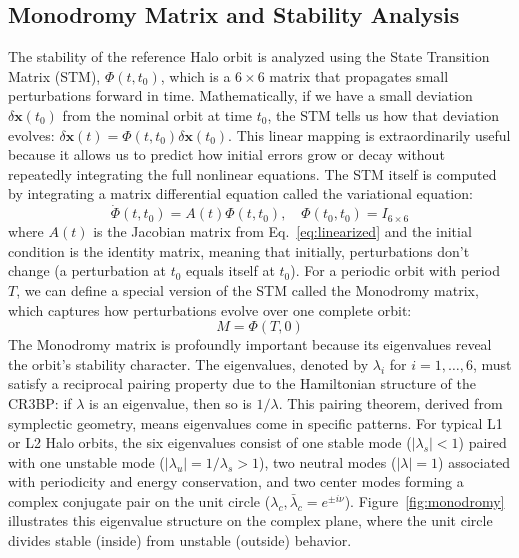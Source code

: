 \documentclass[10pt,letterpaper]{article}
\begin{document}
\subsection{Monodromy Matrix and Stability Analysis}
The stability of the reference Halo orbit is analyzed using the State Transition Matrix (STM), $\Phi(t, t_0)$, which is a $6 \times 6$ matrix that propagates small perturbations forward in time. Mathematically, if we have a small deviation $\delta \mathbf{x}(t_0)$ from the nominal orbit at time $t_0$, the STM tells us how that deviation evolves: $\delta \mathbf{x}(t) = \Phi(t, t_0) \delta \mathbf{x}(t_0)$. This linear mapping is extraordinarily useful because it allows us to predict how initial errors grow or decay without repeatedly integrating the full nonlinear equations. The STM itself is computed by integrating a matrix differential equation called the variational equation:
\begin{equation}
    \dot{\Phi}(t, t_0) = A(t) \Phi(t, t_0), \quad \Phi(t_0, t_0) = I_{6 \times 6} \label{eq:stm}
\end{equation}
where $A(t)$ is the Jacobian matrix from Eq.~\ref{eq:linearized} and the initial condition is the identity matrix, meaning that initially, perturbations don't change (a perturbation at $t_0$ equals itself at $t_0$). For a periodic orbit with period $T$, we can define a special version of the STM called the Monodromy matrix, which captures how perturbations evolve over one complete orbit:
\begin{equation}
    M = \Phi(T, 0) \label{eq:monodromy}
\end{equation}
The Monodromy matrix is profoundly important because its eigenvalues reveal the orbit's stability character. The eigenvalues, denoted by $\lambda_i$ for $i=1,\dots,6$, must satisfy a reciprocal pairing property due to the Hamiltonian structure of the CR3BP: if $\lambda$ is an eigenvalue, then so is $1/\lambda$. This pairing theorem, derived from symplectic geometry, means eigenvalues come in specific patterns.  For typical L1 or L2 Halo orbits, the six eigenvalues consist of one stable mode ($|\lambda_s| < 1$) paired with one unstable mode ($|\lambda_u| = 1/\lambda_s > 1$), two neutral modes ($|\lambda| = 1$) associated with periodicity and energy conservation, and two center modes forming a complex conjugate pair on the unit circle ($\lambda_{c}, \bar{\lambda}_{c} = e^{\pm i \nu}$). Figure~\ref{fig:monodromy} illustrates this eigenvalue structure on the complex plane, where the unit circle divides stable (inside) from unstable (outside) behavior.
\end{document}
